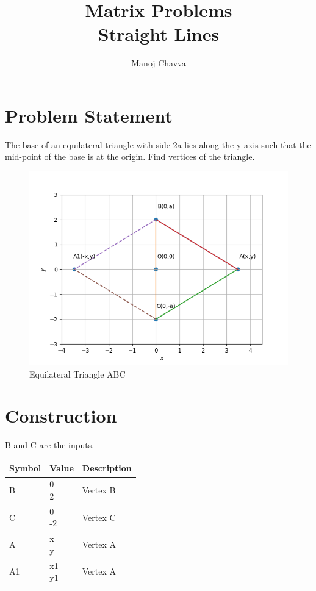 \documentclass[journal,12pt,twocolumn]{IEEEtran}
\title{Matrix Problems \textbf{\\Straight Lines }}
\author{Manoj Chavva}
\newcommand{\myvec}[1]{\ensuremath{\begin{pmatrix}#1\end{pmatrix}}}
\begin{document}
\maketitle



\section{Problem Statement}

\noindent The base of an equilateral triangle with side 2a lies along the y-axis such that the mid-point of the base is at the origin. Find vertices of the triangle.


\begin{figure}[h]
\includegraphics[width=1\columnwidth]{triangle.png}
\caption{Equilateral Triangle ABC}
\label{fig:triangle}
\end{figure}

\section{Construction}
B and C are the inputs.
\begin{table}[h]
\centering
\large
\begin{tabular}{|l|l|l|}
\hline
\textbf{Symbol} & \textbf{Value} & \textbf{Description} \\ \hline
B               & \myvec{0 \\ 2}         & Vertex B             \\ \hline
C               & \myvec{0 \\ -2}        & Vertex C             \\ \hline
A               & \myvec{x \\ y}          & Vertex A             \\ \hline
A1              & \myvec{x1 \\ y1}       & Vertex A             \\ \hline
\end{tabular}
\end{table}
\end{document}
